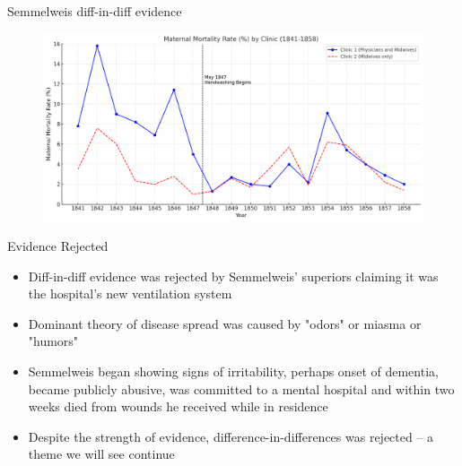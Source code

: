 \documentclass{beamer}
\begin{document}
\begin{frame}{Semmelweis diff-in-diff evidence}

	\begin{figure}
	\includegraphics[scale=0.4]{./lecture_includes/semmelweis_graphic.png}
	\end{figure}


\end{frame}

\begin{frame}{Evidence Rejected}

\begin{itemize}

\item Diff-in-diff evidence was rejected by Semmelweis' superiors claiming it was the hospital's new ventilation system
\item Dominant theory of disease spread was caused by "odors" or miasma or "humors"
\item Semmelweis began showing signs of irritability, perhaps onset of dementia, became publicly abusive, was committed to a mental hospital and within two weeks died from wounds he received while in residence
\item Despite the strength of evidence, difference-in-differences was rejected -- a theme we will see continue

\end{itemize}

\end{frame}
\end{document}
